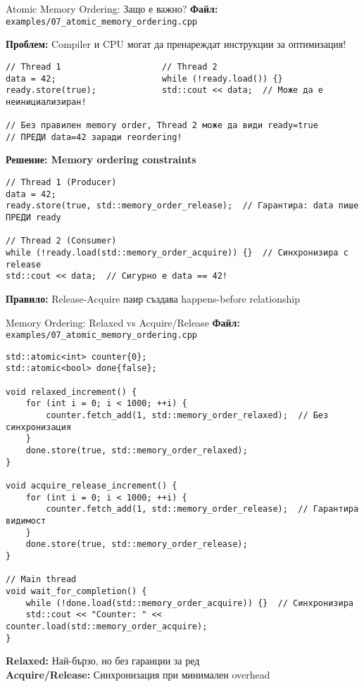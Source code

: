 \documentclass[aspectratio=169]{beamer}
\begin{document}
\begin{frame}[fragile]{Atomic Memory Ordering: Защо е важно?}
\textbf{Файл:} \texttt{examples/07\_atomic\_memory\_ordering.cpp}

\textbf{Проблем:} Compiler и CPU могат да пренареждат инструкции за оптимизация!

\begin{lstlisting}[basicstyle=\ttfamily\tiny]
// Thread 1                    // Thread 2
data = 42;                     while (!ready.load()) {}
ready.store(true);             std::cout << data;  // Може да е неинициализиран!

// Без правилен memory order, Thread 2 може да види ready=true 
// ПРЕДИ data=42 заради reordering!
\end{lstlisting}

\textbf{Решение: Memory ordering constraints}
\begin{lstlisting}[basicstyle=\ttfamily\tiny]
// Thread 1 (Producer)
data = 42;
ready.store(true, std::memory_order_release);  // Гарантира: data пише ПРЕДИ ready

// Thread 2 (Consumer)
while (!ready.load(std::memory_order_acquire)) {}  // Синхронизира с release
std::cout << data;  // Сигурно е data == 42!
\end{lstlisting}

\textbf{Правило:} Release-Acquire паир създава happens-before relationship
\end{frame}

\begin{frame}[fragile]{Memory Ordering: Relaxed vs Acquire/Release}
\textbf{Файл:} \texttt{examples/07\_atomic\_memory\_ordering.cpp}
\begin{lstlisting}[basicstyle=\ttfamily\tiny]
std::atomic<int> counter{0};
std::atomic<bool> done{false};

void relaxed_increment() {
    for (int i = 0; i < 1000; ++i) {
        counter.fetch_add(1, std::memory_order_relaxed);  // Без синхронизация
    }
    done.store(true, std::memory_order_relaxed);
}

void acquire_release_increment() {
    for (int i = 0; i < 1000; ++i) {
        counter.fetch_add(1, std::memory_order_release);  // Гарантира видимост
    }
    done.store(true, std::memory_order_release);
}

// Main thread
void wait_for_completion() {
    while (!done.load(std::memory_order_acquire)) {}  // Синхронизира
    std::cout << "Counter: " << counter.load(std::memory_order_acquire);
}
\end{lstlisting}

\textbf{Relaxed:} Най-бързо, но без гаранции за ред \\
\textbf{Acquire/Release:} Синхронизация при минимален overhead
\end{frame}
\end{document}
